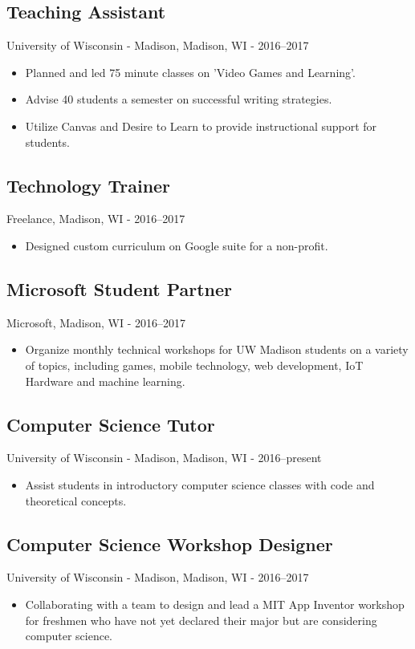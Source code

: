 \documentclass[../main.tex]{subfiles}
\begin{document}
	\subsection*{Teaching Assistant}
     University of Wisconsin - Madison, Madison, WI - 2016--2017
	\begin{itemize}
		\item{Planned and led 75 minute classes on 'Video Games and Learning'.}
		\item{Advise 40 students a semester on successful writing strategies.}
		\item{Utilize Canvas and Desire to Learn to provide instructional support for students.}
	\end{itemize}

	\subsection*{Technology Trainer}
     Freelance, Madison, WI - 2016--2017
	\begin{itemize}
		\item{Designed custom curriculum on Google suite for a non-profit.}
	\end{itemize}


	\subsection*{Microsoft Student Partner}
     Microsoft, Madison, WI - 2016--2017
	\begin{itemize}
		\item{Organize monthly technical workshops for UW Madison students on a variety of topics, including games, mobile technology, web development, IoT Hardware and machine learning.}
	\end{itemize}

	\subsection*{Computer Science Tutor}
     University of Wisconsin - Madison, Madison, WI - 2016--present
	\begin{itemize}
		\item{Assist students in introductory computer science classes with code and theoretical concepts.}
	\end{itemize}

	\subsection*{Computer Science Workshop Designer}
     University of Wisconsin - Madison, Madison, WI - 2016--2017
	\begin{itemize}
		\item{Collaborating with a team to design and lead a MIT App Inventor workshop for freshmen who have not yet declared their major but are considering computer science.}
	\end{itemize}
\end{document}
